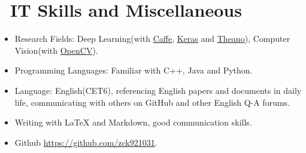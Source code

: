 \documentclass{resume}
\begin{document}
\section{\faCogs\ IT Skills and Miscellaneous}
\begin{itemize}[parsep=0.5ex]
	\item Research Fields: Deep Learning(with \href{http://caffe.berkeleyvision.org/}{Caffe}, \href{https://keras.io/}{Keras} and \href{http://deeplearning.net/software/theano/}{Theano}), Computer Vision(with \href{http://opencv.org/}{OpenCV}).
	\item Programming Languages: Familiar with C++, Java and Python.
  \item Language: English(CET6), referencing English papers and documents in daily life, communicating with others on GitHub and other English Q-A forums.
  \item Writing with LaTeX and Markdown, good communication skills.
  \item \faGithub Github \href{https://github.com/zck921031}{https://github.com/zck921031}.
\end{itemize}
%
%
\end{document}
